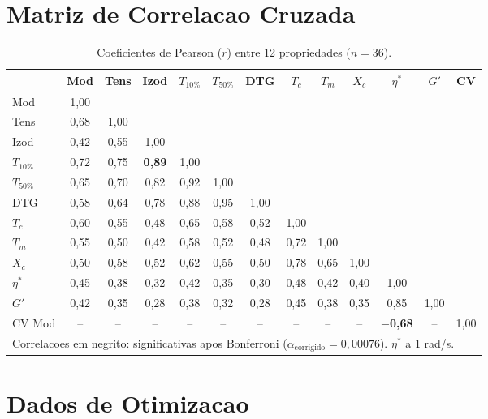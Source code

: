 \documentclass[11pt,a4paper]{article}
\begin{document}
\section{Matriz de Correlacao Cruzada}

\begin{table}[H]\centering
\caption{Coeficientes de Pearson ($r$) entre 12 propriedades ($n=36$).}\label{tab:corr_bruta}
\footnotesize
\begin{tabular}{lcccccccccccc}
\toprule
 & {\bfseries Mod} & {\bfseries Tens} & {\bfseries Izod} & {\bfseries $T_{10\%}$} & {\bfseries $T_{50\%}$} & {\bfseries DTG} & {\bfseries $T_c$} & {\bfseries $T_m$} & {\bfseries $X_c$} & {\bfseries $\eta^*$} & {\bfseries $G'$} & {\bfseries CV} \\
\midrule
Mod & 1,00 & & & & & & & & & & & \\
Tens & 0,68 & 1,00 & & & & & & & & & & \\
Izod & 0,42 & 0,55 & 1,00 & & & & & & & & & \\
$T_{10\%}$ & 0,72 & 0,75 & {\bfseries 0,89} & 1,00 & & & & & & & & \\
$T_{50\%}$ & 0,65 & 0,70 & 0,82 & 0,92 & 1,00 & & & & & & & \\
DTG & 0,58 & 0,64 & 0,78 & 0,88 & 0,95 & 1,00 & & & & & & \\
$T_c$ & 0,60 & 0,55 & 0,48 & 0,65 & 0,58 & 0,52 & 1,00 & & & & & \\
$T_m$ & 0,55 & 0,50 & 0,42 & 0,58 & 0,52 & 0,48 & 0,72 & 1,00 & & & & \\
$X_c$ & 0,50 & 0,58 & 0,52 & 0,62 & 0,55 & 0,50 & 0,78 & 0,65 & 1,00 & & & \\
$\eta^*$ & 0,45 & 0,38 & 0,32 & 0,42 & 0,35 & 0,30 & 0,48 & 0,42 & 0,40 & 1,00 & & \\
$G'$ & 0,42 & 0,35 & 0,28 & 0,38 & 0,32 & 0,28 & 0,45 & 0,38 & 0,35 & 0,85 & 1,00 & \\
CV Mod & -- & -- & -- & -- & -- & -- & -- & -- & -- & {\bfseries $-$0,68} & -- & 1,00 \\
\bottomrule
\multicolumn{13}{l}{Correlacoes em negrito: significativas apos Bonferroni ($\alpha_{\text{corrigido}}=0,00076$). $\eta^*$ a 1 rad/s.} \\
\end{tabular}
\end{table}

\section{Dados de Otimizacao}
\end{document}
